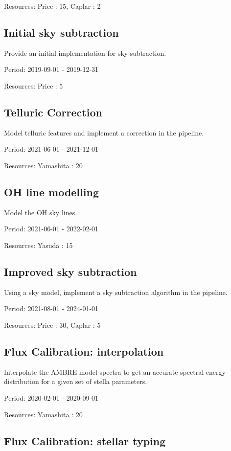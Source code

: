 Resources: Price : 15, Caplar : 2

\subsection{Initial sky subtraction}

Provide an initial implementation for sky subtraction.

Period: 2019-09-01 - 2019-12-31

Resources: Price : 5

\subsection{Telluric Correction}

Model telluric features and implement a correction in the pipeline.

Period: 2021-06-01 - 2021-12-01

Resources: Yamashita : 20

\subsection{OH line modelling}

Model the OH sky lines.

Period: 2021-06-01 - 2022-02-01

Resources: Yasuda : 15

\subsection{Improved sky subtraction}

Using a sky model, implement a sky subtraction algorithm in the pipeline.

Period: 2021-08-01 - 2024-01-01

Resources: Price : 30, Caplar : 5

\subsection{Flux Calibration: interpolation}

Interpolate the AMBRE model spectra to get an accurate spectral energy distribution for a given set of stella parameters.

Period: 2020-02-01 - 2020-09-01

Resources: Yamashita : 20

\subsection{Flux Calibration: stellar typing}

